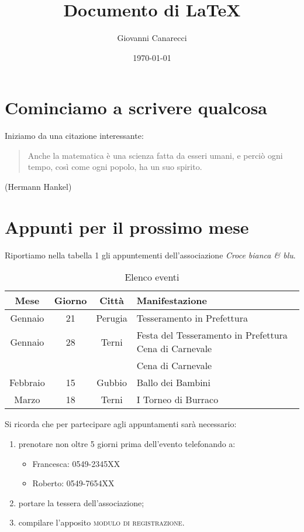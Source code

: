 \documentclass[a4paper,10pt]{article}
\title{Documento di \LaTeX}
\author{Giovanni Canarecci}
\date{\today}
\begin{document}
\maketitle

\section{Cominciamo a scrivere qualcosa}
Iniziamo da una citazione interessante:
\begin{quote}
 \item Anche la matematica è una scienza fatta da esseri umani, e perciò ogni tempo, così come ogni popolo, ha un suo spirito.
\end{quote}
\begin{flushright}
 (Hermann Hankel)
\end{flushright}

\section{Appunti per il prossimo mese}
Riportiamo nella tabella 1 gli appuntementi dell'associazione \textit{Croce bianca \& blu}.

\begin{table}[h]
\caption{Elenco eventi}
\begin{tabular}{|c|c|c|l|}
\hline
Mese&Giorno&Città&Manifestazione\\
\hline
\hline
Gennaio&21&Perugia&Tesseramento in Prefettura\\
\hline
Gennaio&28&Terni&Festa del Tesseramento in Prefettura Cena di Carnevale\\
 & & &Cena di Carnevale\\
\hline
Febbraio&15&Gubbio&Ballo dei Bambini\\
\hline
Marzo&18&Terni&I Torneo di Burraco\\
\hline
\end{tabular}
\end{table}

Si ricorda che per partecipare agli appuntamenti sarà necessario:\\
\begin{enumerate}
\item
prenotare non oltre 5 giorni prima dell'evento telefonando a:
\begin{itemize}
\item
Francesca: 0549-2345XX
 \item 
Roberto: 0549-7654XX
\end{itemize}
\item
portare la tessera dell'associazione;
\item
compilare l'apposito \textsc{modulo di registrazione}.

\end{enumerate}
\end{document}
